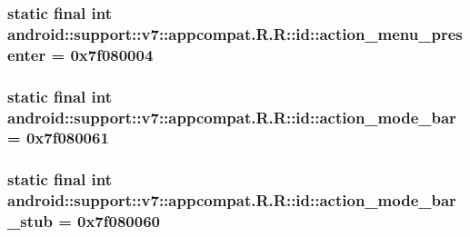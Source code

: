\hypertarget{classandroid_1_1support_1_1v7_1_1appcompat_1_1_r_1_1id_2c1d98ba2cc2daaff663444bff05e7ee}{
\subsubsection[{action\_\-menu\_\-presenter}]{\setlength{\rightskip}{0pt plus 5cm}static final int android::support::v7::appcompat.R.R::id::action\_\-menu\_\-presenter = 0x7f080004}}
\label{classandroid_1_1support_1_1v7_1_1appcompat_1_1_r_1_1id_2c1d98ba2cc2daaff663444bff05e7ee}


\hypertarget{classandroid_1_1support_1_1v7_1_1appcompat_1_1_r_1_1id_34c19a2d7d12c9f448990331d0af472c}{
\subsubsection[{action\_\-mode\_\-bar}]{\setlength{\rightskip}{0pt plus 5cm}static final int android::support::v7::appcompat.R.R::id::action\_\-mode\_\-bar = 0x7f080061}}
\label{classandroid_1_1support_1_1v7_1_1appcompat_1_1_r_1_1id_34c19a2d7d12c9f448990331d0af472c}


\hypertarget{classandroid_1_1support_1_1v7_1_1appcompat_1_1_r_1_1id_41ef2bedf0ec6abbbdb7cce92fd94310}{
\subsubsection[{action\_\-mode\_\-bar\_\-stub}]{\setlength{\rightskip}{0pt plus 5cm}static final int android::support::v7::appcompat.R.R::id::action\_\-mode\_\-bar\_\-stub = 0x7f080060}}
\label{classandroid_1_1support_1_1v7_1_1appcompat_1_1_r_1_1id_41ef2bedf0ec6abbbdb7cce92fd94310}


